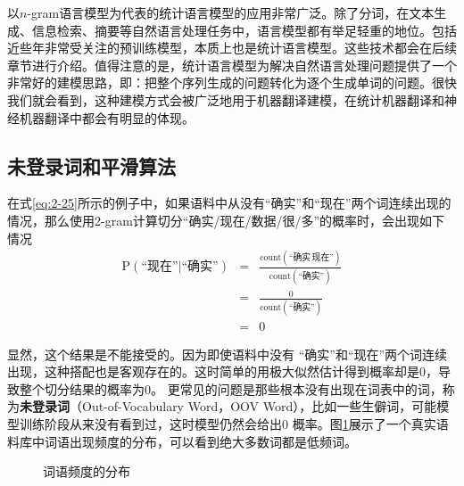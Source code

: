 \parinterval 以$n$-gram语言模型为代表的统计语言模型的应用非常广泛。除了分词，在文本生成、信息检索、摘要等自然语言处理任务中，语言模型都有举足轻重的地位。包括近些年非常受关注的预训练模型，本质上也是统计语言模型。这些技术都会在后续章节进行介绍。值得注意的是，统计语言模型为解决自然语言处理问题提供了一个非常好的建模思路，即：把整个序列生成的问题转化为逐个生成单词的问题。很快我们就会看到，这种建模方式会被广泛地用于机器翻译建模，在统计机器翻译和神经机器翻译中都会有明显的体现。


\subsection{未登录词和平滑算法}\label{sec2:smoothing}

\parinterval 在式\ref{eq:2-25}所示的例子中，如果语料中从没有``确实''和``现在''两个词连续出现的情况，那么使用2-gram计算切分``确实/现在/数据/很/多''的概率时，会出现如下情况
\begin{eqnarray}
\textrm{P}(\textrm{``现在''}|\textrm{``确实''}) & =  & \frac{\textrm{count}(\textrm{``确实}\,\textrm{现在''})}{\textrm{count}(\textrm{``确实''})} \nonumber \\
                                                                     & =  & \frac{0}{\textrm{count}(\textrm{``确实''})} \nonumber \\
                                                                     & =  & 0
\label{eq:2-26}
\end{eqnarray}

\parinterval 显然，这个结果是不能接受的。因为即使语料中没有 ``确实''和``现在''两个词连续出现，这种搭配也是客观存在的。这时简单的用极大似然估计得到概率却是0，导致整个切分结果的概率为0。 更常见的问题是那些根本没有出现在词表中的词，称为{\small\sffamily\bfseries{未登录词}}（Out-of-Vocabulary Word，OOV Word），比如一些生僻词，可能模型训练阶段从来没有看到过，这时模型仍然会给出0 概率。图\ref{fig:2-18}展示了一个真实语料库中词语出现频度的分布，可以看到绝大多数词都是低频词。

\begin{figure}[htp]
    \centering

	 \caption{词语频度的分布}
    \label{fig:2-18}
\end{figure}

